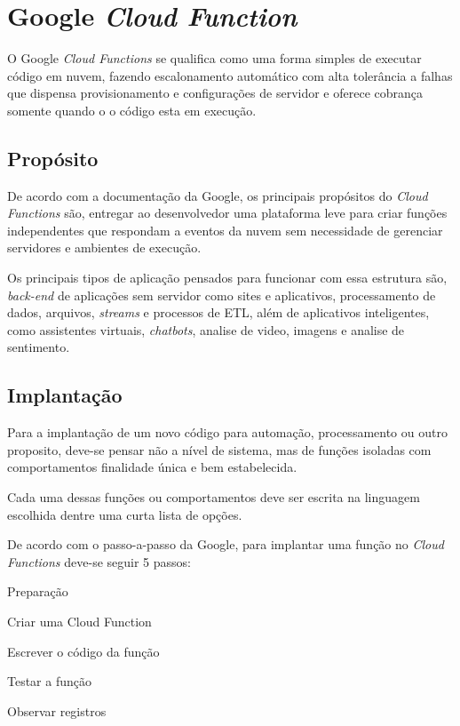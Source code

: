 \section{Google \textit{Cloud Function}}

O Google \textit{Cloud Functions} se qualifica como uma forma simples de executar código em nuvem, fazendo escalonamento automático com alta tolerância a falhas que dispensa provisionamento e configurações de servidor e oferece cobrança somente quando o o código esta em execução.

\subsection{Propósito}

De acordo com a documentação da Google, os principais propósitos do \textit{Cloud Functions} são, entregar ao desenvolvedor uma plataforma leve para criar funções independentes que respondam a eventos da nuvem sem necessidade de gerenciar servidores e ambientes de execução.

Os principais tipos de aplicação pensados para funcionar com essa estrutura são, \textit{back-end} de aplicações sem servidor como sites e aplicativos, processamento de dados, arquivos, \textit{streams} e processos de ETL, além de aplicativos inteligentes, como assistentes virtuais, \textit{chatbots}, analise de video, imagens e analise de sentimento.

\subsection{Implantação}
Para a implantação de um novo código para automação, processamento ou outro proposito, deve-se pensar não a nível de sistema, mas de funções isoladas com comportamentos finalidade única e bem estabelecida.

\bigskip
Cada uma dessas funções ou comportamentos deve ser escrita na linguagem escolhida dentre uma curta lista de opções.

\bigskip
De acordo com o passo-a-passo da Google, para implantar uma função no \textit{Cloud Functions} deve-se seguir 5 passos:
\begin{alineas}
	\item Preparação
	\item Criar uma Cloud Function
	\item Escrever o código da função
	\item Testar a função
	\item Observar registros
\end{alineas}

